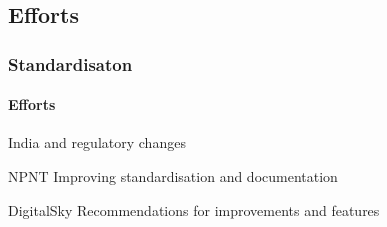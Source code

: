 \documentclass[usenames,dvipsnames,aspectratio=169,serif]{beamer}
\begin{document}
\subsection{Efforts}
\begin{frame}[fragile] %
   \frametitle{Standardisaton}
   \framesubtitle{Efforts}
   India and regulatory changes
   \begin{block}{NPNT}
      Improving standardisation and documentation
   \end{block}

   \begin{block}{DigitalSky\texttrademark}
      Recommendations for improvements and features
   \end{block}

\end{frame}

\end{document}
